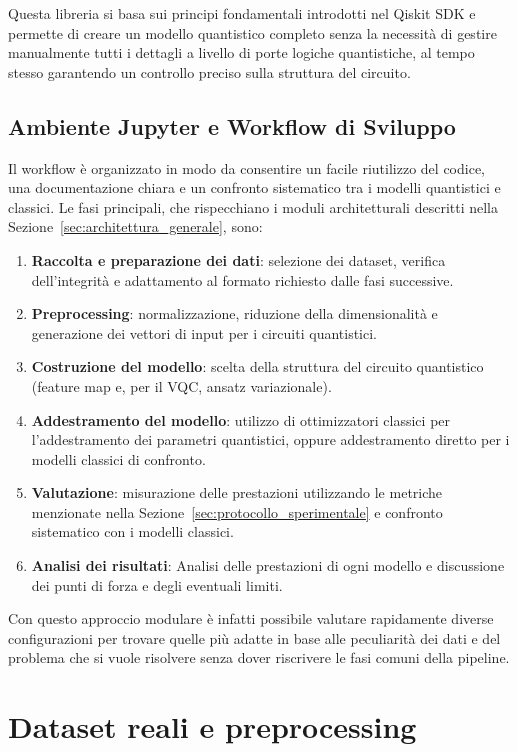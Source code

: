 Questa libreria si basa sui principi fondamentali introdotti nel Qiskit SDK e permette di creare un modello quantistico completo senza la necessità di gestire manualmente tutti i dettagli a livello di porte logiche quantistiche, al tempo stesso garantendo un controllo preciso sulla struttura del circuito.

\subsection{Ambiente Jupyter e Workflow di Sviluppo}
Il workflow è organizzato in modo da consentire un facile riutilizzo del codice, una documentazione chiara e un confronto sistematico tra i modelli quantistici e classici.
Le fasi principali, che rispecchiano i moduli architetturali descritti nella Sezione~\ref{sec:architettura_generale}, sono:

\begin{enumerate}
    \item \textbf{Raccolta e preparazione dei dati}: selezione dei dataset, verifica dell'integrità e adattamento al formato richiesto dalle fasi successive.
    \item \textbf{Preprocessing}: normalizzazione, riduzione della dimensionalità e generazione dei vettori di input per i circuiti quantistici.
    \item \textbf{Costruzione del modello}: scelta della struttura del circuito quantistico (feature map e, per il VQC, ansatz variazionale).
    \item \textbf{Addestramento del modello}: utilizzo di ottimizzatori classici per l'addestramento dei parametri quantistici, oppure addestramento diretto per i modelli classici di confronto.
    \item \textbf{Valutazione}: misurazione delle prestazioni utilizzando le metriche menzionate nella Sezione~\ref{sec:protocollo_sperimentale} e confronto sistematico con i modelli classici.
    \item \textbf{Analisi dei risultati}: Analisi delle prestazioni di ogni modello e discussione dei punti di forza e degli eventuali limiti.
\end{enumerate}

Con questo approccio modulare è infatti possibile valutare rapidamente diverse configurazioni per trovare quelle più adatte in base alle peculiarità dei dati e del problema che si vuole risolvere senza dover riscrivere le fasi comuni della pipeline.

\section{Dataset reali e preprocessing}
\label{sec:dataset_preprocessing}

